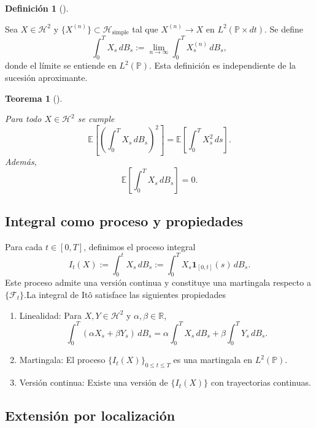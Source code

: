 \documentclass[
  spanish,
  us-letterpaper,
]{scrreprt}
\theoremstyle{plain}
\newtheorem{theorem}{Teorema}[chapter]
\theoremstyle{plain}
\theoremstyle{definition}
\newtheorem{definition}{Definición}[chapter]
\theoremstyle{remark}
\begin{document}
\begin{definition}[]\protect\hypertarget{def-integral_ito_H2}{}\label{def-integral_ito_H2}

Sea \(X \in \mathcal{H}^2\) y
\(\{X^{(n)}\} \subset \mathcal{H}_{\text{simple}}\) tal que
\(X^{(n)} \to X\) en \(L^2(\mathbb{P} \times dt)\). Se define
\[\int_0^T X_s \, dB_s := \lim_{n \to \infty} \int_0^T X^{(n)}_s \, dB_s,\]
donde el límite se entiende en \(L^2(\mathbb{P})\). Esta definición es
independiente de la sucesión aproximante.

\end{definition}

\begin{theorem}[]\protect\hypertarget{thm-isometria_ito_H2}{}\label{thm-isometria_ito_H2}

Para todo \(X \in \mathcal{H}^2\) se cumple
\[ \mathbb{E} \left[ \left( \int_0^T X_s \, dB_s \right)^2 \right] = \mathbb{E} \left[ \int_0^T X_s^2 \, ds \right].\]
Además, \[ \mathbb{E} \left[ \int_0^T X_s \, dB_s \right] = 0.\]

\end{theorem}

\subsection{Integral como proceso y
propiedades}\label{integral-como-proceso-y-propiedades}

Para cada \(t \in [0,T]\), definimos el proceso integral
\[I_t(X) := \int_0^t X_s \, dB_s := \int_0^T X_s \mathbf{1}_{[0,t]}(s) \, dB_s.\]
Este proceso admite una versión continua y constituye una martingala
respecto a \(\{\mathcal{F}_t\}\).La integral de Itô satisface las
siguientes propiedades

\begin{enumerate}
\def\labelenumi{\alph{enumi}.}
\item
  Linealidad: Para \(X, Y \in \mathcal{H}^2\) y
  \(\alpha, \beta \in \mathbb{R}\),
  \[ \int_0^T (\alpha X_s + \beta Y_s) \, dB_s = \alpha \int_0^T X_s \, dB_s + \beta \int_0^T Y_s \, dB_s.\]
\item
  Martingala: El proceso \(\{I_t(X)\}_{0 \leq t \leq T}\) es una
  martingala en \(L^2(\mathbb{P})\).
\item
  Versión continua: Existe una versión de \(\{I_t(X)\}\) con
  trayectorias continuas.
\end{enumerate}

\subsection{Extensión por
localización}\label{extensiuxf3n-por-localizaciuxf3n}
\end{document}
